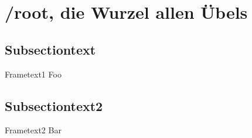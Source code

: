 \section[/root]{/root, die Wurzel allen Übels}
\subsection{Subsectiontext}
\begin{frame}{Frametext1}
Foo
\end{frame}

\subsection{Subsectiontext2}
\begin{frame}{Frametext2}
Bar
\end{frame}